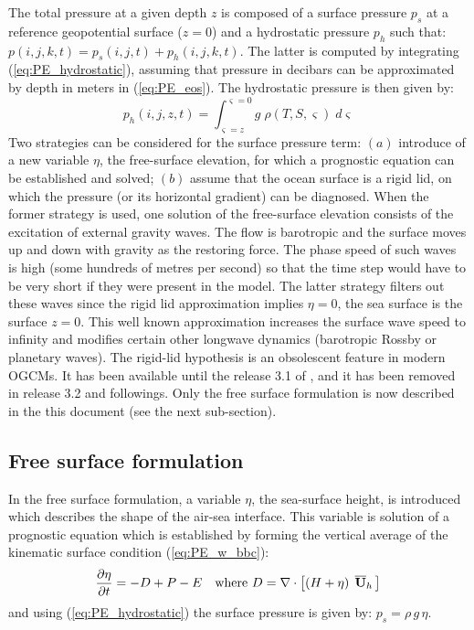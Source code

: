 \documentclass[../main/NEMO_manual]{subfiles}
\begin{document}
The total pressure at a given depth $z$ is composed of a surface pressure $p_s$ at
a reference geopotential surface ($z=0$) and a hydrostatic pressure $p_h$ such that:
$p(i,j,k,t)=p_s(i,j,t)+p_h(i,j,k,t)$.
The latter is computed by integrating (\autoref{eq:PE_hydrostatic}),
assuming that pressure in decibars can be approximated by depth in meters in (\autoref{eq:PE_eos}).
The hydrostatic pressure is then given by:
\[
  p_h \left( {i,j,z,t} \right)
  = \int_{\varsigma =z}^{\varsigma =0} {g\;\rho \left( {T,S,\varsigma} \right)\;d\varsigma }
\]
Two strategies can be considered for the surface pressure term:
$(a)$ introduce of a  new variable $\eta$, the free-surface elevation,
for which a prognostic equation can be established and solved;
$(b)$ assume that the ocean surface is a rigid lid,
on which the pressure (or its horizontal gradient) can be diagnosed.
When the former strategy is used, one solution of the free-surface elevation consists of
the excitation of external gravity waves.
The flow is barotropic and the surface moves up and down with gravity as the restoring force.
The phase speed of such waves is high (some hundreds of metres per second) so that
the time step would have to be very short if they were present in the model.
The latter strategy filters out these waves since the rigid lid approximation implies $\eta=0$,
\ie the sea surface is the surface $z=0$.
This well known approximation increases the surface wave speed to infinity and
modifies certain other longwave dynamics (\eg barotropic Rossby or planetary waves).
The rigid-lid hypothesis is an obsolescent feature in modern OGCMs.
It has been available until the release 3.1 of  \NEMO, and it has been removed in release 3.2 and followings.
Only the free surface formulation is now described in the this document (see the next sub-section).

\subsection{Free surface formulation}
\label{subsec:PE_free_surface}

In the free surface formulation, a variable $\eta$, the sea-surface height,
is introduced which describes the shape of the air-sea interface.
This variable is solution of a prognostic equation which is established by forming the vertical average of
the kinematic surface condition (\autoref{eq:PE_w_bbc}):
\begin{equation}
  \label{eq:PE_ssh}
  \frac{\partial \eta }{\partial t}=-D+P-E
  \quad \text{where} \
  D=\nabla \cdot \left[ {\left( {H+\eta } \right) \; {\rm{\bf \overline{U}}}_h \,} \right]
\end{equation}
and using (\autoref{eq:PE_hydrostatic}) the surface pressure is given by: $p_s = \rho \, g \, \eta$.
\end{document}
